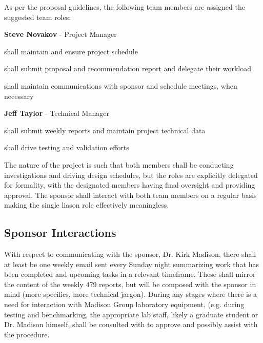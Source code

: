 As per the proposal guidelines, the following team members are assigned the
suggested team roles:
\begin{packed_itemize}
  \item{\textbf{Steve Novakov} - Project Manager}
    \begin{packed_itemize}
      \item shall maintain and ensure project schedule
      \item shall submit proposal and recommendation report and delegate their
      workload
      \item shall maintain communications with sponsor and schedule meetings,
      when necessary
    \end{packed_itemize}
  \item{\textbf{Jeff Taylor} - Technical Manager}
    \begin{packed_itemize}
      \item shall submit weekly reports and maintain project technical data
      \item shall drive testing and validation efforts
    \end{packed_itemize}
\end{packed_itemize}

The nature of the project is such that both members shall be conducting
investigations and driving design schedules, but the roles are explicitly
delegated for formality, with the designated members having final oversight
and providing approval. The sponsor shall interact with both team members on a
regular basis making the single liason role effectively meaningless.

\subsection{Sponsor Interactions}  %

With respect to communicating with the sponsor, Dr. Kirk Madison, there shall
at least be one weekly email sent every Sunday night summarizing work that has
been completed and upcoming tasks in a relevant timeframe. These shall mirror
the content of the weekly 479 reports, but will be composed with the sponsor in
mind (more specifics, more technical jargon). During any stages where there
is a need for interaction with Madison Group laboratory equipment, (e.g. during
testing and benchmarking, the appropriate lab staff, likely a graduate
student or Dr. Madison himself, shall be consulted with to approve and possibly
assist with the procedure.

